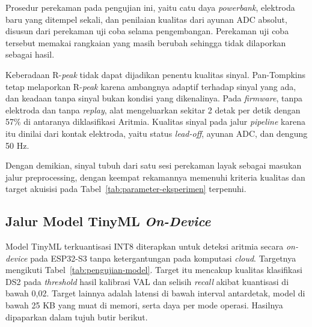 Prosedur perekaman pada pengujian ini, yaitu catu daya \textit{powerbank}, elektroda baru yang ditempel sekali, dan penilaian kualitas dari ayunan ADC absolut, disusun dari perekaman uji coba selama pengembangan. Perekaman uji coba tersebut memakai rangkaian yang masih berubah sehingga tidak dilaporkan sebagai hasil.

Keberadaan R-\textit{peak} tidak dapat dijadikan penentu kualitas sinyal. Pan-Tompkins tetap melaporkan R-\textit{peak} karena ambangnya adaptif terhadap sinyal yang ada, dan keadaan tanpa sinyal bukan kondisi yang dikenalinya. Pada \textit{firmware}, tanpa elektroda dan tanpa \textit{replay}, alat mengeluarkan sekitar 2 detak per detik dengan 57\% di antaranya diklasifikasi Aritmia. Kualitas sinyal pada jalur \textit{pipeline} karena itu dinilai dari kontak elektroda, yaitu status \textit{lead-off}, ayunan ADC, dan dengung 50 Hz.

Dengan demikian, sinyal tubuh dari satu sesi perekaman layak sebagai masukan jalur preprocessing, dengan keempat rekamannya memenuhi kriteria kualitas dan target akuisisi pada Tabel~\ref{tab:parameter-eksperimen} terpenuhi.

\subsection{Jalur Model TinyML \textit{On-Device}}

Model TinyML terkuantisasi INT8 diterapkan untuk deteksi aritmia secara \textit{on-device} pada ESP32-S3 tanpa ketergantungan pada komputasi \textit{cloud}. Targetnya mengikuti Tabel~\ref{tab:pengujian-model}. Target itu mencakup kualitas klasifikasi DS2 pada \textit{threshold} hasil kalibrasi VAL dan selisih \textit{recall} akibat kuantisasi di bawah 0,02. Target lainnya adalah latensi di bawah interval antardetak, model di bawah 25 KB yang muat di memori, serta daya per mode operasi. Hasilnya dipaparkan dalam tujuh butir berikut.

